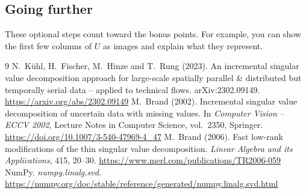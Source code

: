 \documentclass[11pt,a4paper]{article}
\begin{document}
\subsection*{Going further}
These optional steps count toward the bonus points. For example, you can show
the first few columns of $U$ as images and explain what they represent.

\begin{thebibliography}{9}
   N.~Kühl, H.~Fischer, M.~Hinze and T.~Rung (2023). An
    incremental singular value decomposition approach for large-scale
    spatially parallel \& distributed but temporally serial data -- applied
    to technical flows. arXiv:2302.09149.
    \url{https://arxiv.org/abs/2302.09149}
   M.~Brand (2002). Incremental singular value
    decomposition of uncertain data with missing values. In
    \emph{Computer Vision -- ECCV 2002}, Lecture Notes in Computer Science,
    vol.~2350, Springer. \url{https://doi.org/10.1007/3-540-47969-4_47}
   M.~Brand (2006). Fast low-rank modifications of the
    thin singular value decomposition. \emph{Linear Algebra and its
    Applications}, 415, 20--30.
    \url{https://www.merl.com/publications/TR2006-059}
   NumPy. \emph{numpy.linalg.svd}.
    \url{https://numpy.org/doc/stable/reference/generated/numpy.linalg.svd.html}
\end{thebibliography}
\end{document}
